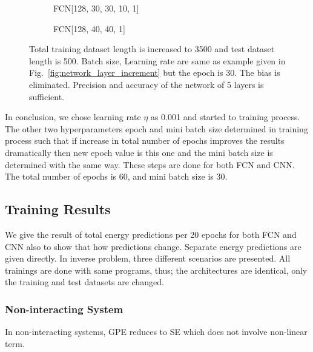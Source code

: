 \documentclass[a4paper,times,12pt]{article}
\begin{document}
\begin{figure}[H]
    \centering
    \begin{subfigure}[t]{0.45\textwidth}
		\centering
        
        \caption{FCN[128, 30, 30, 10, 1]}
		\label{fig:a}
    \end{subfigure}
    \begin{subfigure}[t]{0.45\textwidth}
        \centering
        
        \caption{FCN[128, 40, 40, 1]}
		\label{fig:b}
    \end{subfigure}
    \caption{Total training dataset length is increased to 3500 and test dataset length is 500. Batch size, Learning rate are same as example given in Fig.~\ref{fig:network_layer_increment} but the epoch is 30. The bias is eliminated. Precision and accuracy of the network of 5 layers is sufficient.}
\end{figure}

In conclusion, we chose learning rate $\eta$ as 0.001 and started to training process. The other two hyperparameters epoch and mini batch size determined in training process such that if increase in total number of epochs improves the results dramatically then new epoch value is this one and the mini batch size is determined with the same way. These steps are done for both FCN and CNN. The total number of epochs is 60, and mini batch size is 30. 


\subsection{Training Results}

We give the result of total energy predictions per 20 epochs for both FCN and CNN also to show that how predictions change. Separate energy predictions are given directly. In inverse problem, three different scenarios are presented. All trainings are done with same programs, thus; the architectures are identical, only the training and test datasets are changed. 

\subsubsection{Non-interacting System}

In non-interacting systems, GPE reduces to SE which does not involve non-linear term. 
\end{document}
